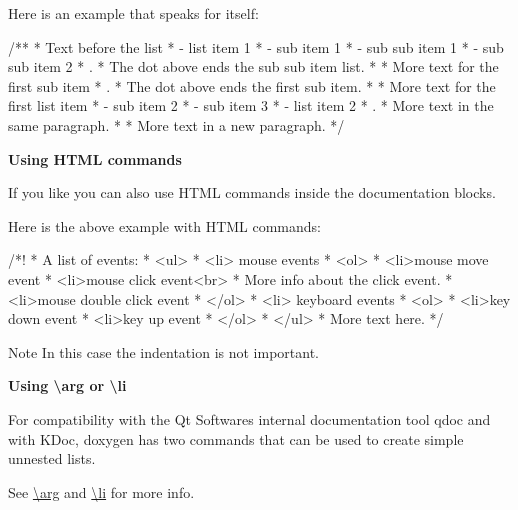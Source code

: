 Here is an example that speaks for itself\+:

\begin{DoxyVerb}/**
 * Text before the list
 * - list item 1
 *   - sub item 1
 *     - sub sub item 1
 *     - sub sub item 2
 *     . 
 *     The dot above ends the sub sub item list.
 *
 *     More text for the first sub item
 *   .
 *   The dot above ends the first sub item.
 *
 *   More text for the first list item
 *   - sub item 2
 *   - sub item 3
 * - list item 2
 * .
 * More text in the same paragraph.
 *
 * More text in a new paragraph.
 */
\end{DoxyVerb}


{\bfseries{Using H\+T\+ML commands}}

If you like you can also use H\+T\+ML commands inside the documentation blocks.

Here is the above example with H\+T\+ML commands\+: \begin{DoxyVerb}  /*! 
   *  A list of events:
   *  <ul>
   *  <li> mouse events
   *     <ol>
   *     <li>mouse move event
   *     <li>mouse click event<br>
   *         More info about the click event.
   *     <li>mouse double click event
   *     </ol>
   *  <li> keyboard events
   *     <ol>     
   *     <li>key down event
   *     <li>key up event
   *     </ol>
   *  </ul>
   *  More text here.
   */
\end{DoxyVerb}


\begin{DoxyNote}{Note}
In this case the indentation is not important.
\end{DoxyNote}
{\bfseries{Using \textbackslash{}arg or \textbackslash{}li}}

For compatibility with the Qt Software\textquotesingle{}s internal documentation tool qdoc and with K\+Doc, doxygen has two commands that can be used to create simple unnested lists.

See \mbox{\hyperlink{commands_cmdarg}{\textbackslash{}arg}} and \mbox{\hyperlink{commands_cmdli}{\textbackslash{}li}} for more info.

 